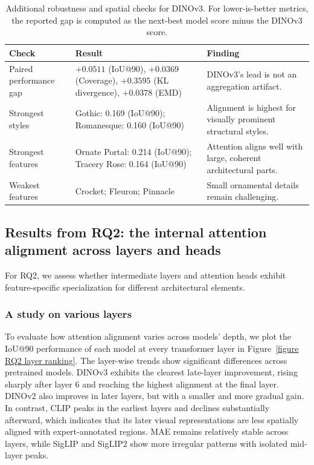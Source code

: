 \documentclass[lineno,pdflatex,sn-mathphys-num]{sn-jnl}%
\theoremstyle{thmstyleone}%
\theoremstyle{thmstyletwo}%
\theoremstyle{thmstylethree}%
\begin{document}
\begin{table}[!h]
\centering
\caption{Additional robustness and spatial checks for DINOv3. For lower-is-better metrics, the reported gap is computed as the next-best model score minus the DINOv3 score.\label{table RQ1 dinov3}}
\begin{tabular}{lp{}p{}}
\toprule
Check & Result & Finding \\ \midrule
Paired performance gap & $+0.0511$ (IoU@90), $+0.0369$ (Coverage), $+0.3595$ (KL divergence), $+0.0378$ (EMD) & DINOv3's lead is not an aggregation artifact. \\
Strongest styles & Gothic: 0.169 (IoU@90); Romanesque: 0.160 (IoU@90) & Alignment is highest for visually prominent structural styles. \\
Strongest features & Ornate Portal: 0.214 (IoU@90); Tracery Rose: 0.164 (IoU@90) & Attention aligns well with large, coherent architectural parts. \\
Weakest features & Crocket; Fleuron; Pinnacle & Small ornamental details remain challenging. \\
\bottomrule
\end{tabular}
\end{table}


\subsection{Results from RQ2: the internal attention alignment across layers and heads}

For RQ2, we assess whether intermediate layers and attention heads exhibit feature-specific specialization for different architectural elements. 

\subsubsection{A study on various layers}

To evaluate how attention alignment varies across models' depth, we plot the IoU@90 performance of each model at every transformer layer in Figure~\ref{figure RQ2 layer ranking}. The layer-wise trends show significant differences across pretrained models. DINOv3 exhibits the clearest late-layer improvement, rising sharply after layer 6 and reaching the highest alignment at the final layer. DINOv2 also improves in later layers, but with a smaller and more gradual gain. In contrast, CLIP peaks in the earliest layers and declines substantially afterward, which indicates that its later visual representations are less spatially aligned with expert-annotated regions. MAE remains relatively stable across layers, while SigLIP and SigLIP2 show more irregular patterns with isolated mid-layer peaks. 
\end{document}
